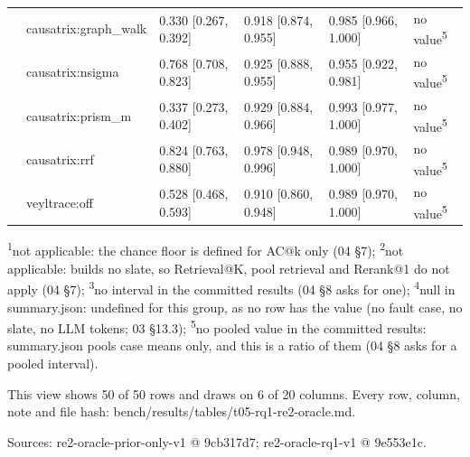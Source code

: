\begin{table}[t]
\begin{tabular}{@{}llllll@{}}
 & causatrix:graph\_walk & 0.330 [0.267, 0.392] & 0.918 [0.874, 0.955] & 0.985 [0.966, 1.000] & no value\textsuperscript{5} \\
 & causatrix:nsigma & 0.768 [0.708, 0.823] & 0.925 [0.888, 0.955] & 0.955 [0.922, 0.981] & no value\textsuperscript{5} \\
 & causatrix:prism\_m & 0.337 [0.273, 0.402] & 0.929 [0.884, 0.966] & 0.993 [0.977, 1.000] & no value\textsuperscript{5} \\
 & causatrix:rrf & 0.824 [0.763, 0.880] & 0.978 [0.948, 0.996] & 0.989 [0.970, 1.000] & no value\textsuperscript{5} \\
 & veyltrace:off & 0.528 [0.468, 0.593] & 0.910 [0.860, 0.948] & 0.989 [0.970, 1.000] & no value\textsuperscript{5} \\
\hline
\end{tabular}
\par\smallskip\scriptsize\raggedright
\textsuperscript{1}not applicable: the chance floor is defined for AC@k only (04 \S{}7); \textsuperscript{2}not applicable: builds no slate, so Retrieval@K, pool retrieval and Rerank@1 do not apply (04 \S{}7); \textsuperscript{3}no interval in the committed results (04 \S{}8 asks for one); \textsuperscript{4}null in summary.json: undefined for this group, as no row has the value (no fault case, no slate, no LLM tokens; 03 \S{}13.3); \textsuperscript{5}no pooled value in the committed results: summary.json pools case means only, and this is a ratio of them (04 \S{}8 asks for a pooled interval).\par
This view shows 50 of 50 rows and draws on 6 of 20 columns. Every row, column, note and file hash: bench/\allowbreak{}results/\allowbreak{}tables/\allowbreak{}t05-rq1-re2-oracle.md.\par
Sources: re2-oracle-prior-only-v1 @ 9cb317d7; re2-oracle-rq1-v1 @ 9e553e1c.\par
\end{table}
